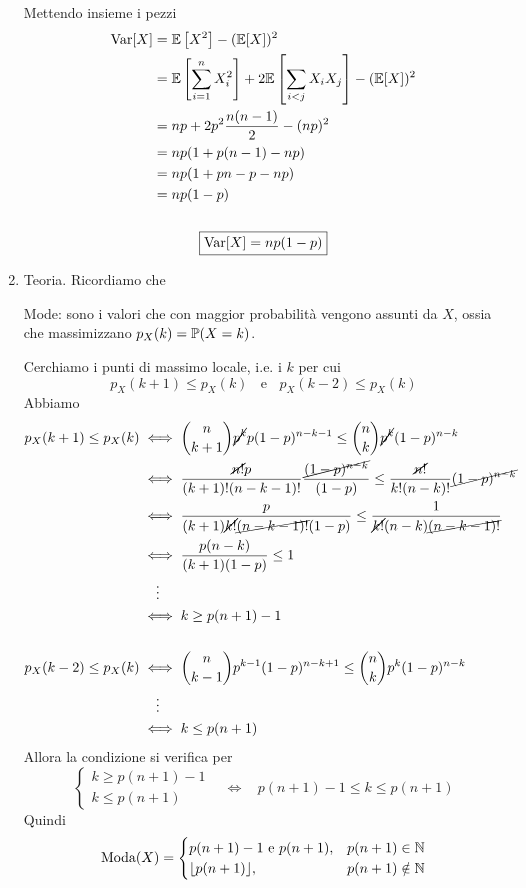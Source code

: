 \begin{enumerate}
Mettendo insieme i pezzi
\begin{gather*}
\begin{aligned}
\mathrm{Var}[X] & =\mathbb{E}\left[X^{2}\right] -(\mathbb{E}[X])^{2}\\
 & =\mathbb{E}\left[\sum\limits_{i=1}^{n} X_{i}^{2}\right] +2\mathbb{E}\left[\sum\limits_{i< j} X_{i} X_{j}\right] -(\mathbb{E}[X])^{2}\\
 & =np+2p^{2}\frac{n(n-1)}{2} -(np)^{2}\\
 & =np(1+p(n-1) -np)\\
 & =np(1+pn-p-np)\\
 & =np(1-p)
\end{aligned}\\
\\
\boxed{\mathrm{Var}[X] =np(1-p)}
\end{gather*}
\item Teoria. Ricordiamo che

Mode: sono i valori che con maggior probabilità vengono assunti da $X$, ossia che massimizzano $p_{X}(k) =\mathbb{P}(X=k)$.

Cerchiamo i punti di massimo locale, i.e. i $k$ per cui
\begin{equation*}
\boxed{p_{X}(k+1) \leq p_{X}(k) \ \ \ \ \text{e} \ \ \ \ p_{X}(k-2) \leq p_{X}(k)}
\end{equation*}
Abbiamo
\begin{align*}
p_{X}(k+1) \leq p_{X}(k) & \iff \binom{n}{k+1}\cancel{p^{k}} p(1-p)^{n-k-1} \leq \binom{n}{k}\cancel{p^{k}}(1-p)^{n-k}\\
 & \iff \frac{\cancel{n!} p}{(k+1) !(n-k-1) !}\frac{\cancel{(1-p)^{n-k}}}{(1-p)} \leq \frac{\cancel{n!}}{k!(n-k) !}\cancel{(1-p)^{n-k}}\\
 & \iff \frac{p}{(k+1)\cancel{k!}\cancel{(n-k-1) !}(1-p)} \leq \frac{1}{\cancel{k!}(n-k)\cancel{(n-k-1) !}}\\
 & \iff \frac{p(n-k)}{(k+1)(1-p)} \leq 1\\
 & \quad\vdots \\
 & \iff k\geq p(n+1) -1\\
 & \\
p_{X}(k-2) \leq p_{X}(k) & \iff \binom{n}{k-1} p^{k-1}(1-p)^{n-k+1} \leq \binom{n}{k} p^{k}(1-p)^{n-k}\\
 & \quad\vdots \\
 & \iff k\leq p(n+1)
\end{align*}
Allora la condizione si verifica per
\begin{equation*}
\begin{cases}
k\geq p(n+1) -1\\
k\leq p(n+1)
\end{cases}
 \ \ \ \ \iff \ \ \ \ p(n+1) -1\leq k\leq p(n+1)
\end{equation*}
Quindi
\begin{equation*}
\text{Moda}(X) =
\begin{cases}
p(n+1) -1\ \text{e} \ p(n+1) , & p(n+1) \in \mathbb{N}\\
\lfloor p(n+1)\rfloor , & p(n+1) \notin \mathbb{N}
\end{cases}
\end{equation*}
\end{enumerate}

